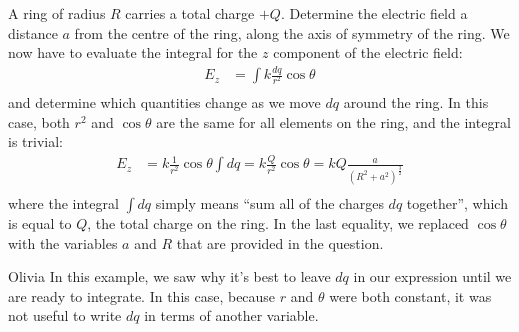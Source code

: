 \begin{example}{\label{ex:chargesfields:ring}A ring of radius $R$ carries a total charge $+Q$. Determine the electric field a distance $a$ from the centre of the ring, along the axis of symmetry of the ring.}
We now have to evaluate the integral for the $z$ component of the electric field:
\begin{align*}
E_z &= \int k\frac{dq}{r^2}\cos\theta \\
\end{align*}
and determine which quantities change as we move $dq$ around the ring. In this case, both $r^2$ and $\cos\theta$ are the same for all elements on the ring, and the integral is trivial:
\begin{align*}
E_z &= k\frac{1}{r^2}\cos\theta\int dq=k\frac{Q}{r^2}\cos\theta=kQ\frac{a}{(R^2+a^2)^\frac{3}{2}}  \\
\end{align*}
where the integral $\int dq$ simply means ``sum all of the charges $dq$ together'', which is equal to $Q$, the total charge on the ring. 
In the last equality, we replaced $\cos\theta$ with the variables $a$ and $R$ that are provided in the question.
\end{example}

\begin{studentOpinion}{Olivia}
In this example, we saw why it's best to leave $dq$ in our expression until we are ready to integrate. In this case, because $r$ and $\theta$ were both constant, it was not useful to write $dq$ in terms of another variable. 
\end{studentOpinion}

